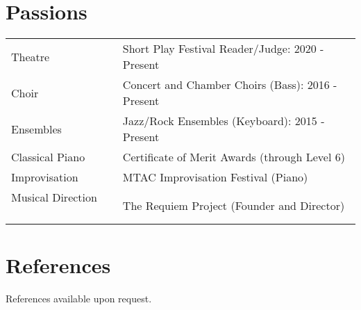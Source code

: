\documentclass[letter,10pt]{article}
\begin{document}
\section{Passions}
\begin{tabularx}{\linewidth}{@{}l X@{}}	
    Theatre & Short Play Festival Reader/Judge: 2020 - Present \\[2.75pt]
    Choir & Concert and Chamber Choirs (Bass): 2016 - Present \\[2.75pt]
    Ensembles & Jazz/Rock Ensembles (Keyboard): 2015 - Present \\[2.75pt]
    Classical Piano & Certificate of Merit Awards (through Level 6) \\[2.75pt]
    Improvisation & MTAC Improvisation Festival (Piano) \\[2.75pt]
    Musical Direction \qquad \ \ \ & The Requiem Project (Founder and Director)
\end{tabularx}

\section{References}
References available upon request.



\end{document}
